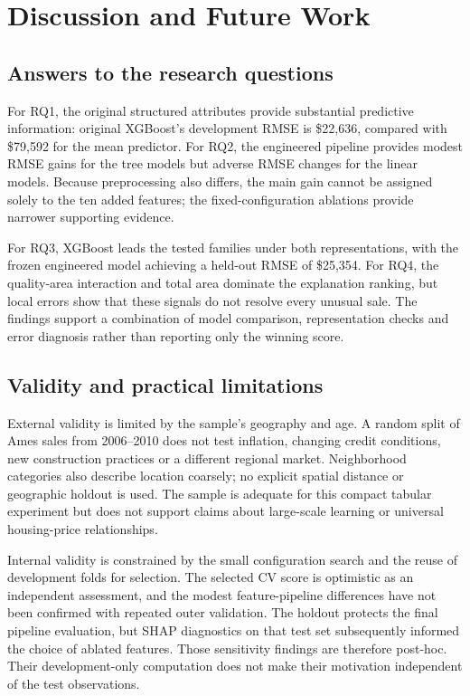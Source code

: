 \documentclass{sigkddExp}
\begin{document}
\section{Discussion and Future Work}
\subsection{Answers to the research questions}
For RQ1, the original structured attributes provide substantial predictive information: original XGBoost's development RMSE is \$22,636, compared with \$79,592 for the mean predictor. For RQ2, the engineered pipeline provides modest RMSE gains for the tree models but adverse RMSE changes for the linear models. Because preprocessing also differs, the main gain cannot be assigned solely to the ten added features; the fixed-configuration ablations provide narrower supporting evidence.

For RQ3, XGBoost leads the tested families under both representations, with the frozen engineered model achieving a held-out RMSE of \$25,354. For RQ4, the quality-area interaction and total area dominate the explanation ranking, but local errors show that these signals do not resolve every unusual sale. The findings support a combination of model comparison, representation checks and error diagnosis rather than reporting only the winning score.

\subsection{Validity and practical limitations}
External validity is limited by the sample's geography and age. A random split of Ames sales from 2006--2010 does not test inflation, changing credit conditions, new construction practices or a different regional market. Neighborhood categories also describe location coarsely; no explicit spatial distance or geographic holdout is used. The sample is adequate for this compact tabular experiment but does not support claims about large-scale learning or universal housing-price relationships.

Internal validity is constrained by the small configuration search and the reuse of development folds for selection. The selected CV score is optimistic as an independent assessment, and the modest feature-pipeline differences have not been confirmed with repeated outer validation. The holdout protects the final pipeline evaluation, but SHAP diagnostics on that test set subsequently informed the choice of ablated features. Those sensitivity findings are therefore post-hoc. Their development-only computation does not make their motivation independent of the test observations.
\end{document}
